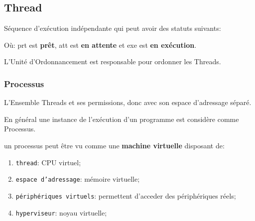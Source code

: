 \documentclass{article}
\begin{document}
\subsection{Thread}
\begin{definition}\label{def:thread}
    Séquence d'exécution indépendante qui peut avoir des statuts suivants:
    \begin{figure}[H]
        \centering
    \end{figure}
    Où: prt est \textbf{prêt}, att est \textbf{en attente} et exe est \textbf{en exécution}.
    
    \begin{remark}
        L'Unité d'Ordonnancement est responsable pour ordonner les Threads.
    \end{remark}
\end{definition}

\subsubsection{Processus}
\begin{definition}\label{def:processus}
    L'Ensemble Threads et ses permissions, donc avec son espace d'adressage séparé.

    \begin{remark}
        En général une instance de l'exécution d'un programme est considère comme Processus.
    \end{remark}

    \begin{phrase}
        un processus peut être vu comme une \textbf{machine virtuelle} disposant de:
        \begin{enumerate}[noitemsep]
            \item \texttt{thread}: CPU virtuel;
            \item \texttt{espace d'adressage}: mémoire virtuelle;
            \item \texttt{périphériques virtuels}: permettent d'acceder des périphériques réels;
            \item \texttt{hyperviseur}: noyau virtuelle;
        \end{enumerate}
    \end{phrase}
\end{definition}
\end{document}
